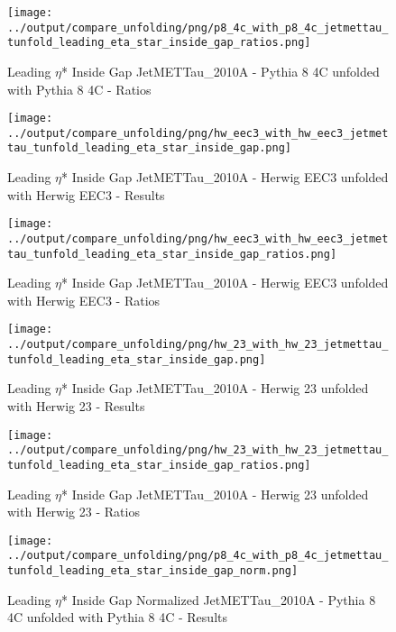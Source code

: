 \documentclass[11pt]{book}
\begin{document}
\begin{figure}[ht]
\centering
\texttt{[image: ../output/compare\_unfolding/png/p8\_4c\_with\_p8\_4c\_jetmettau\_tunfold\_leading\_eta\_star\_inside\_gap\_ratios.png]}
\caption{Leading $\eta$* Inside Gap JetMETTau\_2010A - Pythia 8 4C unfolded with Pythia 8 4C - Ratios}
\label{p8_p8_jetmettau_tunfold_leading_eta_star_inside_gap_b}
\end{figure}

\begin{figure}[ht]
\centering
\texttt{[image: ../output/compare\_unfolding/png/hw\_eec3\_with\_hw\_eec3\_jetmettau\_tunfold\_leading\_eta\_star\_inside\_gap.png]}
\caption{Leading $\eta$* Inside Gap JetMETTau\_2010A - Herwig EEC3 unfolded with Herwig EEC3 - Results}
\label{hw_eec3_hw_eec3_jetmettau_tunfold_leading_eta_star_inside_gap_a}
\end{figure}

\begin{figure}[ht]
\centering
\texttt{[image: ../output/compare\_unfolding/png/hw\_eec3\_with\_hw\_eec3\_jetmettau\_tunfold\_leading\_eta\_star\_inside\_gap\_ratios.png]}
\caption{Leading $\eta$* Inside Gap JetMETTau\_2010A - Herwig EEC3 unfolded with Herwig EEC3 - Ratios}
\label{hw_eec3_hw_eec3_jetmettau_tunfold_leading_eta_star_inside_gap_b}
\end{figure}

\begin{figure}[ht]
\centering
\texttt{[image: ../output/compare\_unfolding/png/hw\_23\_with\_hw\_23\_jetmettau\_tunfold\_leading\_eta\_star\_inside\_gap.png]}
\caption{Leading $\eta$* Inside Gap JetMETTau\_2010A - Herwig 23 unfolded with Herwig 23 - Results}
\label{hw_23_hw_23_jetmettau_tunfold_leading_eta_star_inside_gap_a}
\end{figure}

\begin{figure}[ht]
\centering
\texttt{[image: ../output/compare\_unfolding/png/hw\_23\_with\_hw\_23\_jetmettau\_tunfold\_leading\_eta\_star\_inside\_gap\_ratios.png]}
\caption{Leading $\eta$* Inside Gap JetMETTau\_2010A - Herwig 23 unfolded with Herwig 23 - Ratios}
\label{hw_23_hw_23_jetmettau_tunfold_leading_eta_star_inside_gap_b}
\end{figure}


\begin{figure}[ht]
\centering
\texttt{[image: ../output/compare\_unfolding/png/p8\_4c\_with\_p8\_4c\_jetmettau\_tunfold\_leading\_eta\_star\_inside\_gap\_norm.png]}
\caption{Leading $\eta$* Inside Gap Normalized JetMETTau\_2010A - Pythia 8 4C unfolded with Pythia 8 4C - Results}
\label{p8_p8_jetmettau_tunfold_leading_eta_star_inside_gap_norm_a}
\end{figure}
\end{document}
